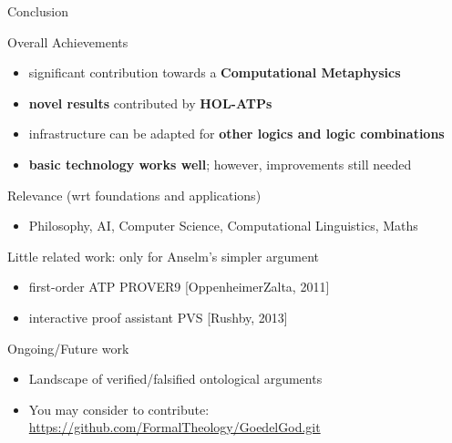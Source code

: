 \documentclass[9pt,mathserif,unknownkeysallowed,xcolor=dvipsnames]{beamer}
\begin{document}
\begin{frame}{Conclusion}
\begin{block}{Overall Achievements}
\begin{itemize}
\item significant contribution towards a \textbf{Computational Metaphysics}
\item \textbf{novel results} contributed by \textbf{HOL-ATPs}
\item infrastructure can be adapted for \textbf{other logics and logic
    combinations}
\item \textbf{basic technology works well}; however, improvements
  still needed 
\end{itemize}
\end{block}
\vfill

\begin{block}{Relevance (wrt foundations and applications)}
\begin{itemize}
\item Philosophy, AI, Computer Science, Computational Linguistics, Maths
\end{itemize}
\end{block}
\vfill

\begin{block}{Little related work: only for Anselm's simpler argument}
\begin{itemize}
\item first-order ATP \textsc{PROVER9} \hfill{\small [OppenheimerZalta, 2011]}
\item interactive proof assistant \textsc{PVS}  \hfill{\small [Rushby, 2013]}
\end{itemize}
\end{block}

\vfill
\begin{block}{Ongoing/Future work}
\begin{itemize}
\item Landscape of verified/falsified ontological arguments
\item You may consider to contribute: \url{https://github.com/FormalTheology/GoedelGod.git}
\end{itemize}
\end{block}
\end{frame}
\end{document}
